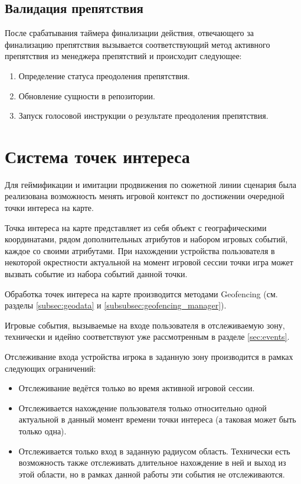\subsection*{Валидация препятствия}
После срабатывания таймера финализации действия, отвечающего за финализацию препятствия вызывается соответствующий метод активного препятствия из менеджера препятствий и происходит следующее:
\begin{enumerate}
	\item Определение статуса преодоления препятствия.
	\item Обновление сущности в репозитории.
	\item Запуск голосовой инструкции о результате преодоления препятствия.
\end{enumerate}

\section{Система точек интереса}
\label{sec:geofencing}
Для геймификации и имитации продвижения по сюжетной линии сценария была реализована возможность менять игровой контекст по достижении очередной точки интереса на карте.

Точка интереса на карте представляет из себя объект с географическими координатами, рядом дополнительных атрибутов и набором игровых событий, каждое со своими атрибутами. При нахождении устройства пользователя в некоторой окрестности актуальной на момент игровой сессии точки игра может вызвать событие из набора событий данной точки.

Обработка точек интереса на карте производится методами Geofencing (см. разделы \ref{subsec:geodata} и \ref{subsubsec:geofencing_manager}).

Игровые события, вызываемые на входе пользователя в отслеживаемую зону, технически и идейно соответствуют уже рассмотренным в разделе \ref{sec:events}.

Отслеживание входа устройства игрока в заданную зону производится в рамках следующих ограничений:
\begin{itemize}
	\item Отслеживание ведётся только во время активной игровой сессии.
	\item Отслеживается нахождение пользователя только относительно одной актуальной в данный момент времени точки интереса (а таковая может быть только одна).
	\item Отслеживается только вход в заданную радиусом область. Технически есть возможность также отслеживать длительное нахождение в ней и выход из этой области, но в рамках данной работы эти события не отслеживаются.
\end{itemize}